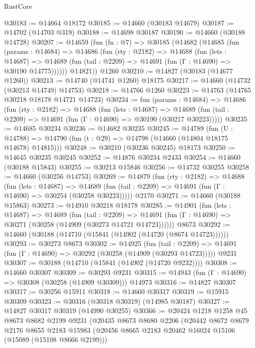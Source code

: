 \begin{lexlean}{RustCore}
\begin{coremodule}
@30183 := @14664 @18172
@30185 := @14660 (@30183 @14679)
@30187 := @14702 (@14703 @319)
@30188 := @14698 @30187
@30190 := @14660 (@30188 @14728)
@30207 := @14659
    (fun (fn : @7) =>
    @30185
      (@14682
        (@14685
          (fun (params : @14684) =>
          @14686
            (fun (rty : @2182) =>
            @14688
              (fun (lets : @14687) =>
              @14689 (fun (tail : @2209) => @14691 (fun (Γ : @14690) => @30190 @14775))))))
        @14821))
    @1260
@30210 := @14827 (@30183 (@14677 @1260))
@30213 := @14740 (@14741 @1260) @18175
@30217 := @14660 (@14732 (@30213 @14749) @14753)
@30218 := @14766 @1260
@30223 := @14763 (@14765 @30218 @18178 @14721 @14723)
@30234 := fun (params : @14684) =>
  @14686
    (fun (rty : @2182) =>
    @14688
      (fun (lets : @14687) =>
      @14689 (fun (tail : @2209) => @14691 (fun (Γ : @14690) => @30190 (@30217 @30223)))))
@30235 := @14685 @30234
@30236 := @14682 @30235
@30245 := @14789
    (fun (U : @14788) => @14790 (fun (t : @29) => @14798 (@14660 (@14804 @18175 @14678) @14815)))
@30248 := @30210 (@30236 @30245) @18173
@30250 := @14645 @30235 @30245
@30252 := @14876 @30234 @2433
@30254 := @14660 (@30188 @15843)
@30255 := @30213 @15846
@30256 := @14732 @30255
@30258 := @14660 (@30256 @14753)
@30269 := @14879
    (fun (rty : @2182) =>
    @14688
      (fun (lets : @14687) =>
      @14689 (fun (tail : @2209) => @14691 (fun (Γ : @14690) => @30254 (@30258 @30223)))))
    @2170
@30271 := @14660 (@30188 @15863)
@30273 := @14910 @30218 @18178
@30285 := @14901
    (fun (lets : @14687) =>
    @14689
      (fun (tail : @2209) =>
      @14691 (fun (Γ : @14690) => @30271 (@30258 (@14909 (@30273 @14721 @14723))))))
    @8673
@30292 := @14660 (@30188 (@14710 (@15841 (@14902 (@14720 (@8674 @14723))))))
@30293 := @30273 @8673
@30302 := @14925
    (fun (tail : @2209) => @14691 (fun (Γ : @14690) => @30292 (@30258 (@14909 (@30293 @14723)))))
    @9231
@30307 := @30188 (@14710 (@15841 (@14902 (@14720 @9232))))
@30308 := @14660 @30307
@30309 := @30293 @9231
@30315 := @14943 (fun (Γ : @14690) => @30308 (@30258 (@14909 @30309))) @14973
@30316 := @14827 @30307
@30317 := @30256 @15911
@30318 := @14660 @30317
@30319 := @15915 @30309
@30323 := @30316 (@30318 @30319) (@14985 @30187)
@30327 := @14827 @30317 @30319 (@14990 @30255)
@30366 := @20424
    @1218
    @1258
    @45
    @8673
    @8682
    @2199
    @9231
    (@20435
      @8673
      @8680
      @2206
      (@20442
        @8672
        @8679
        @2176
        @8655
        @2183
        @15983
        (@20456 @8665 @2183 @20462 @16024 @15106 (@15089 (@15108 @8666 @2199)))

\end{coremodule}
\end{lexlean}
